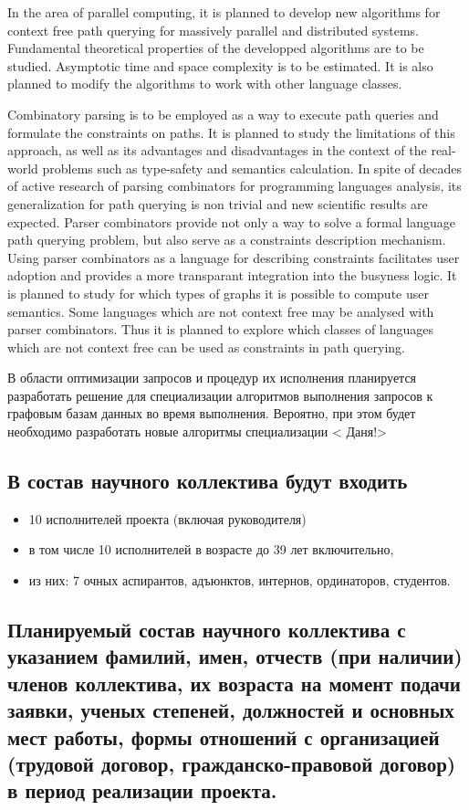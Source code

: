 \documentclass[12pt]{article}  %
\theoremstyle{remark}
\begin{document}
In the area of parallel computing, it is planned to develop new algorithms for context free path querying for massively parallel and distributed systems.
Fundamental theoretical properties of the developped algorithms are to be studied.
Asymptotic time and space complexity is to be estimated.
It is also planned to modify the algorithms to work with other language classes.

Combinatory parsing is to be employed as a way to execute path queries and formulate the constraints on paths.
It is planned to study the limitations of this approach, as well as its advantages and disadvantages in the context of the real-world problems such as type-safety and semantics calculation.
In spite of decades of active research of parsing combinators for programming languages analysis, its generalization for path querying is non trivial and new scientific results are expected.
Parser combinators provide not only a way to solve a formal language path querying problem, but also serve as a constraints description mechanism.
Using parser combinators as a language for describing constraints facilitates user adoption and provides a more transparant integration into the busyness logic.
It is planned to study for which types of graphs it is possible to compute user semantics.
Some languages which are not context free may be analysed with parser combinators.
Thus it is planned to explore which classes of languages which are not context free can be used as constraints in path querying.

В области оптимизации запросов и процедур их исполнения планируется разработать решение для специализации алгоритмов выполнения запросов к графовым базам данных во время выполнения. Вероятно, при этом будет необходимо разработать новые алгоритмы специализации
{\huge< Даня!>}

\subsection{В состав научного коллектива будут входить}
%
\begin{itemize}
\item 10 исполнителей проекта (включая руководителя)
\item в том числе 10  исполнителей в возрасте до 39 лет включительно,
\item из них: 7 очных аспирантов, адъюнктов, интернов, ординаторов, студентов.
\end{itemize}

\subsection{Планируемый состав научного коллектива с указанием фамилий, имен, отчеств (при наличии) членов коллектива, их возраста на момент подачи заявки, ученых степеней, должностей и основных мест работы, формы отношений с организацией (трудовой договор, гражданско-правовой договор) в период реализации проекта.}
\end{document}
